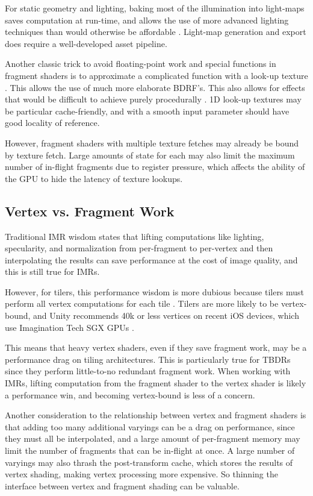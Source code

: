 For static geometry and lighting, baking most of the illumination into
light-maps saves computation at run-time, and allows the use of more advanced
lighting techniques than would otherwise be affordable \cite{Miller99}
\cite{Unity11}.  Light-map generation and export does require a well-developed
asset pipeline.

Another classic trick to avoid floating-point work and special functions in
fragment shaders is to approximate a complicated function with a look-up
texture \cite{Pranckevicius11b}.  This allows the use of much more elaborate
BDRF's.  This also allows for effects that would be difficult to achieve purely
procedurally \cite{Mitchell07}.  1D look-up textures may be particular
cache-friendly, and with a smooth input parameter should have good locality of
reference.  

However, fragment shaders with multiple texture fetches may already be bound by
texture fetch.  Large amounts of state for each may also limit the maximum
number of in-flight fragments due to register pressure, which affects the
ability of the GPU to hide the latency of texture lookups.

\subsection{Vertex vs. Fragment Work}
\label{Jon-McCaffrey-Vertex-vs-Fragment-Work}

Traditional IMR wisdom states that lifting computations like lighting,
specularity, and normalization from per-fragment to per-vertex and then
interpolating the results can save performance at the cost of image quality,
and this is still true for IMRs.

However, for tilers, this performance wisdom is more dubious because tilers
must perform
 all vertex computations for each tile \cite{Apple11}.  Tilers
are more likely to
 be vertex-bound, and Unity recommends 40k or less vertices
on recent iOS
 devices, which use Imagination Tech SGX GPUs \cite{Unity11}.

This means that heavy vertex shaders, even if they save fragment work, may be
a
 performance drag on tiling architectures.  This is particularly true for
TBDRs since they perform
 little-to-no redundant fragment work.  When working
with IMRs, lifting
 computation from the fragment shader to the vertex shader
is likely a
 performance win, and becoming vertex-bound is less of a concern.

Another consideration to the relationship between vertex and fragment shaders
is that adding too many additional varyings can be a drag on performance, since
they must all be interpolated, and a large amount of per-fragment memory may
limit the number of fragments that can be in-flight at once.  A large number of
varyings may also thrash the post-transform cache, which stores the results of
vertex shading, making vertex processing more expensive.  So thinning the
interface between vertex and fragment shading can be valuable.

